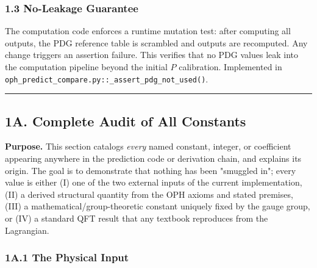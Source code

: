 \subsubsection{1.3 No-Leakage Guarantee}\label{13-no-leakage-guarantee}

The computation code enforces a runtime mutation test: after computing all outputs, the PDG reference table is scrambled and outputs are recomputed. Any change triggers an assertion failure. This verifies that no PDG values leak into the computation pipeline beyond the initial \(P\) calibration. Implemented in \texttt{oph\_predict\_compare.py::\_assert\_pdg\_not\_used()}.

\begin{center}\rule{0.5\linewidth}{0.5pt}\end{center}

\subsection{1A. Complete Audit of All Constants}\label{1a-complete-audit-of-all-constants}

\textbf{Purpose.} This section catalogs \emph{every} named constant, integer, or coefficient appearing anywhere in the prediction code or derivation chain, and explains its origin. The goal is to demonstrate that nothing has been "smuggled in"; every value is either (I) one of the two external inputs of the current implementation, (II) a derived structural quantity from the OPH axioms and stated premises, (III) a mathematical/group-theoretic constant uniquely fixed by the gauge group, or (IV) a standard QFT result that any textbook reproduces from the Lagrangian.

\subsubsection{1A.1 The Physical Input}\label{1a1-the-physical-input}

